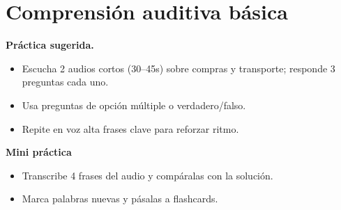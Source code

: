 \section{Comprensión auditiva básica}
\textbf{Práctica sugerida.}
\begin{itemize}[leftmargin=*]
  \item Escucha 2 audios cortos (30--45s) sobre compras y transporte; responde 3 preguntas cada uno.
  \item Usa preguntas de opción múltiple o verdadero/falso.
  \item Repite en voz alta frases clave para reforzar ritmo.
\end{itemize}

\textbf{Mini práctica}
\begin{itemize}[leftmargin=*]
  \item Transcribe 4 frases del audio y compáralas con la solución.
  \item Marca palabras nuevas y pásalas a flashcards.
\end{itemize}
